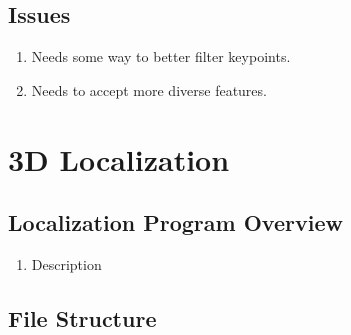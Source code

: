 \documentclass[a4paper,11pt]{article}
\begin{document}
  \subsection{Issues}
    \begin{enumerate}
      \item Needs some way to better filter keypoints.
      \item Needs to accept more diverse features.
    \end{enumerate}
    \newpage




\section{3D Localization}

  \subsection{Localization Program Overview}
  
    \begin{enumerate}
     \item Description
    \end{enumerate}

  
  
  \subsection{File Structure}
  


  

  
\end{document}
